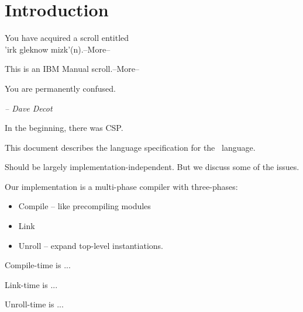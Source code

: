 

\chapter{Introduction}
\label{sec:intro}

\begin{comment}
But in our enthusiasm, we could not resist a radical overhaul of the
system, in which all of its major weaknesses have been exposed,
analyzed, and replaced with new weaknesses.
	-- Bruce Leverett, "Register Allocation in Optimizing Compilers"
\end{comment}

\begin{flushright}
{ \ttfamily
You have acquired a scroll entitled\\
'irk gleknow mizk'(n).--More--

\medskip
This is an IBM Manual scroll.--More--

\medskip
You are permanently confused.

\bigskip
}	%
{\itshape -- Dave Decot}
\end{flushright}


In the beginning, there was CSP\cite{ref:csp}.

This document describes the language specification for the \artxx\ language.  

Should be largely implementation-independent.  
But we discuss some of the issues.  

Our implementation is a multi-phase compiler with three-phases:
\begin{itemize}
\item Compile -- like precompiling modules
\item Link
\item Unroll -- expand top-level instantiations.  
\end{itemize}

Compile-time is ...

Link-time is ...

Unroll-time is ...


